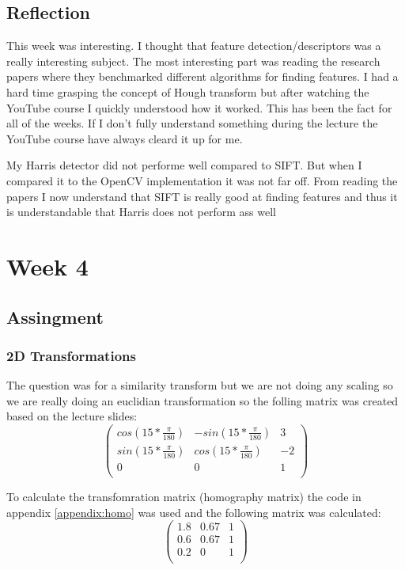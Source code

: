 \documentclass{article}
\begin{document}
    \subsection{Reflection}
    This week was interesting. 
    I thought that feature detection/descriptors was a really interesting subject.
    The most interesting part was reading the research papers where they benchmarked
    different algorithms for finding features. I had a hard time grasping the concept
    of Hough transform but after watching the YouTube course I quickly understood
    how it worked. This has been the fact for all of the weeks. If I don't fully
    understand something during the lecture the YouTube course have always cleard
    it up for me.

    My Harris detector did not performe well compared to SIFT. But when I compared it
    to the OpenCV implementation it was not far off. From reading the papers \cite{art1} \cite{tareen2018comparative}
    I now understand that SIFT is really good at finding features and thus it is understandable that
    Harris does not perform ass well


    \section{Week 4}
    \subsection{Assingment}
    \subsubsection{2D Transformations}
    The question was for a similarity transform but we are not doing any scaling so we are
    really doing an euclidian transformation so the folling matrix was created based
    on the lecture slides:
    \begin{equation}
        \begin{pmatrix}
            cos(15*\frac{\pi}{180}) & -sin(15*\frac{\pi}{180}) & 3 \\
            sin(15*\frac{\pi}{180}) & cos(15*\frac{\pi}{180}) & -2 \\
            0 & 0 & 1 \\
            \end{pmatrix}
    \end{equation}

    To calculate the transfomration matrix (homography matrix) the code in appendix \ref{appendix:homo} was used
    and the following matrix was calculated:
    \begin{equation}
        \begin{pmatrix}
            1.8  & 0.67 & 1 \\
            0.6 & 0.67 & 1\\
            0.2 & 0 & 1 \\
            \end{pmatrix}
    \end{equation}
    
\end{document}
